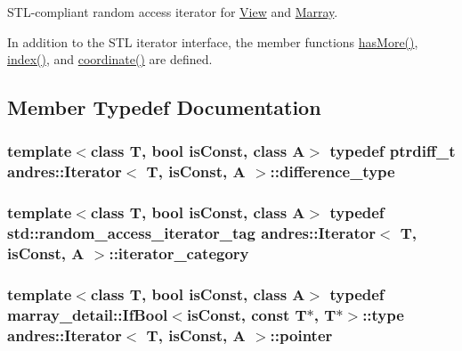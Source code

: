 S\+T\+L-\/compliant random access iterator for \hyperlink{classandres_1_1View}{View} and \hyperlink{classandres_1_1Marray}{Marray}.

In addition to the S\+T\+L iterator interface, the member functions \hyperlink{classandres_1_1Iterator_aa00e98e48b060ec6de7593d473643ef7}{has\+More()}, \hyperlink{classandres_1_1Iterator_a2f5bd43ca080a25450423d5f874b3cdd}{index()}, and \hyperlink{classandres_1_1Iterator_a6b0076e5b74f548e820cbfa6fb7681d7}{coordinate()} are defined. 

\subsection{Member Typedef Documentation}
\hypertarget{classandres_1_1Iterator_a10f8053d87b6b597d9fe011f66a240ca}{}
\subsubsection[{difference\+\_\+type}]{\setlength{\rightskip}{0pt plus 5cm}template$<$class T, bool is\+Const, class A$>$ typedef ptrdiff\+\_\+t {\bf andres\+::\+Iterator}$<$ T, is\+Const, A $>$\+::{\bf difference\+\_\+type}}\label{classandres_1_1Iterator_a10f8053d87b6b597d9fe011f66a240ca}
\hypertarget{classandres_1_1Iterator_a36e37107724fb0c9265f8d3f41f93309}{}
\subsubsection[{iterator\+\_\+category}]{\setlength{\rightskip}{0pt plus 5cm}template$<$class T, bool is\+Const, class A$>$ typedef std\+::random\+\_\+access\+\_\+iterator\+\_\+tag {\bf andres\+::\+Iterator}$<$ T, is\+Const, A $>$\+::{\bf iterator\+\_\+category}}\label{classandres_1_1Iterator_a36e37107724fb0c9265f8d3f41f93309}
\hypertarget{classandres_1_1Iterator_adf2ba3f1a3cc9c98bff9c544afdb22f9}{}
\subsubsection[{pointer}]{\setlength{\rightskip}{0pt plus 5cm}template$<$class T, bool is\+Const, class A$>$ typedef marray\+\_\+detail\+::\+If\+Bool$<$is\+Const, const T$\ast$, T$\ast$$>$\+::type {\bf andres\+::\+Iterator}$<$ T, is\+Const, A $>$\+::{\bf pointer}}\label{classandres_1_1Iterator_adf2ba3f1a3cc9c98bff9c544afdb22f9}
\hypertarget{classandres_1_1Iterator_a9805f26813688f04c33e798f7999e5f7}{}
